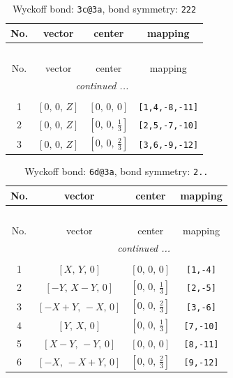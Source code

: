 \documentclass[fleqn,8pt]{jsarticle}
\begin{document}
\renewcommand{\arraystretch}{1.2}
\begin{longtable}{cccc}
\caption{Wyckoff bond: {\tt 3c@3a}, bond symmetry: {\tt 222}}
 \\
 \hline \hline
No. & vector & center & mapping \\ \hline \endfirsthead

\multicolumn{3}{l}{\tablename\ \thetable{}} \\
 \hline \hline
No. & vector & center & mapping \\ \hline \endhead

 \hline \hline
\multicolumn{3}{r}{\footnotesize\it continued ...} \\ \endfoot

 \hline \hline
\multicolumn{3}{r}{} \\ \endlastfoot

1 & $\left[ 0,\, 0,\, Z \right]$ & $\left[ 0,\, 0,\, 0 \right]$ & {\tt [1,4,-8,-11]} \\ \hline
2 & $\left[ 0,\, 0,\, Z \right]$ & $\left[ 0,\, 0,\, \frac{1}{3} \right]$ & {\tt [2,5,-7,-10]} \\ \hline
3 & $\left[ 0,\, 0,\, Z \right]$ & $\left[ 0,\, 0,\, \frac{2}{3} \right]$ & {\tt [3,6,-9,-12]} \\
\end{longtable}
\renewcommand{\arraystretch}{1.2}
\begin{longtable}{cccc}
\caption{Wyckoff bond: {\tt 6d@3a}, bond symmetry: {\tt 2..}}
 \\
 \hline \hline
No. & vector & center & mapping \\ \hline \endfirsthead

\multicolumn{3}{l}{\tablename\ \thetable{}} \\
 \hline \hline
No. & vector & center & mapping \\ \hline \endhead

 \hline \hline
\multicolumn{3}{r}{\footnotesize\it continued ...} \\ \endfoot

 \hline \hline
\multicolumn{3}{r}{} \\ \endlastfoot

1 & $\left[ X,\, Y,\, 0 \right]$ & $\left[ 0,\, 0,\, 0 \right]$ & {\tt [1,-4]} \\ \hline
2 & $\left[ - Y,\, X - Y,\, 0 \right]$ & $\left[ 0,\, 0,\, \frac{1}{3} \right]$ & {\tt [2,-5]} \\ \hline
3 & $\left[ - X + Y,\, - X,\, 0 \right]$ & $\left[ 0,\, 0,\, \frac{2}{3} \right]$ & {\tt [3,-6]} \\ \hline
4 & $\left[ Y,\, X,\, 0 \right]$ & $\left[ 0,\, 0,\, \frac{1}{3} \right]$ & {\tt [7,-10]} \\ \hline
5 & $\left[ X - Y,\, - Y,\, 0 \right]$ & $\left[ 0,\, 0,\, 0 \right]$ & {\tt [8,-11]} \\ \hline
6 & $\left[ - X,\, - X + Y,\, 0 \right]$ & $\left[ 0,\, 0,\, \frac{2}{3} \right]$ & {\tt [9,-12]} \\
\end{longtable}
\end{document}
